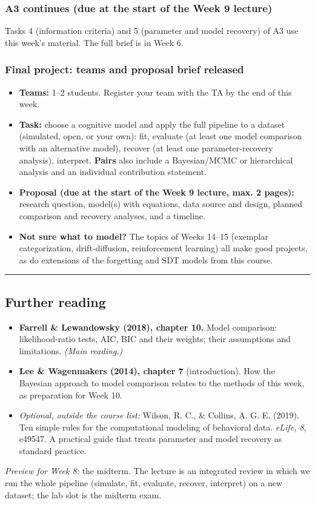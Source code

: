 \subsubsection{A3 continues (due at the start of the Week 9 lecture)}

Tasks 4 (information criteria) and 5 (parameter and model recovery) of
A3 use this week's material. The full brief is in Week 6.

\subsubsection{Final project: teams and proposal brief released}

\begin{itemize}
\tightlist
\item
  \textbf{Teams:} 1--2 students. Register your team with the TA by the
  end of this week.
\item
  \textbf{Task:} choose a cognitive model and apply the full pipeline to
  a dataset (simulated, open, or your own): fit, evaluate (at least one
  model comparison with an alternative model), recover (at least one
  parameter-recovery analysis), interpret. \textbf{Pairs} also include a
  Bayesian/MCMC or hierarchical analysis and an individual contribution
  statement.
\item
  \textbf{Proposal (due at the start of the Week 9 lecture, max. 2
  pages):} research question, model(s) with equations, data source and
  design, planned comparison and recovery analyses, and a timeline.
\item
  \textbf{Not sure what to model?} The topics of Weeks 14--15 (exemplar
  categorization, drift-diffusion, reinforcement learning) all make good
  projects, as do extensions of the forgetting and SDT models from this
  course.
\end{itemize}

\begin{center}\rule{0.5\linewidth}{0.5pt}\end{center}

\subsection{Further reading}

\begin{itemize}
\tightlist
\item
  \textbf{Farrell \& Lewandowsky (2018), chapter 10.} Model comparison:
  likelihood-ratio tests, AIC, BIC and their weights; their assumptions
  and limitations. \emph{(Main reading.)}
\item
  \textbf{Lee \& Wagenmakers (2014), chapter 7} (introduction). How the
  Bayesian approach to model comparison relates to the methods of this
  week, as preparation for Week 10.
\item
  \emph{Optional, outside the course list:} Wilson, R. C., \& Collins,
  A. G. E. (2019). Ten simple rules for the computational modeling of
  behavioral data. \emph{eLife, 8}, e49547. A practical guide that
  treats parameter and model recovery as standard practice.
\end{itemize}

\emph{Preview for Week 8:} the midterm. The lecture is an integrated
review in which we run the whole pipeline (simulate, fit, evaluate,
recover, interpret) on a new dataset; the lab slot is the midterm exam.
